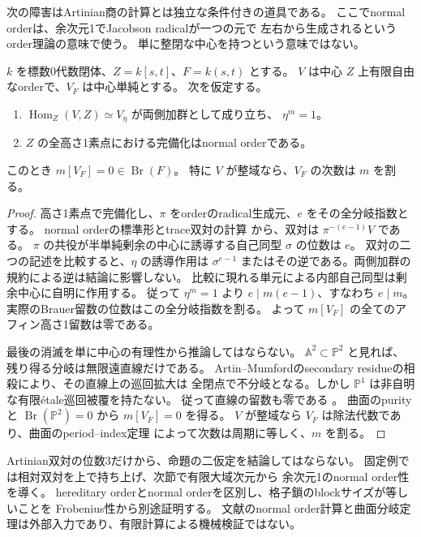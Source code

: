 次の障害はArtinian商の計算とは独立な条件付きの道具である。
ここでnormal orderは、余次元1でJacobson radicalが一つの元で
左右から生成されるというorder理論の意味で使う。
単に整閉な中心を持つという意味ではない。
\begin{proposition}
\label{prop:cubic-Frobenius-order-period}
$k$ を標数0代数閉体、$Z=k[s,t]$、$F=k(s,t)$ とする。
$V$ は中心 $Z$ 上有限自由なorderで、$V_F$ は中心単純とする。
次を仮定する。
\begin{enumerate}
\item $\operatorname{Hom}_Z(V,Z)\simeq V_\eta$ が両側加群として成り立ち、
      $\eta^m=1$。
\item $Z$ の全高さ1素点における完備化はnormal orderである。
\end{enumerate}
このとき $m[V_F]=0\in\operatorname{Br}(F)$。
特に $V$ が整域なら、$V_F$ の次数は $m$ を割る。
\end{proposition}
\begin{proof}
高さ1素点で完備化し、$\pi$ をorderのradical生成元、$e$ をその全分岐指数とする。
normal orderの標準形とtrace双対の計算
\cite[Theorem~10.8, Corollary~10.9, Proposition~10.12]{ChanOrders}
から、双対は $\pi^{-(e-1)}V$ である。
$\pi$ の共役が半単純剰余の中心に誘導する自己同型 $\sigma$ の位数は $e$。
双対の二つの記述を比較すると、$\eta$ の誘導作用は
$\sigma^{e-1}$ またはその逆である。両側加群の規約による逆は結論に影響しない。
比較に現れる単元による内部自己同型は剰余中心に自明に作用する。
従って $\eta^m=1$ より $e\mid m(e-1)$、すなわち $e\mid m$。
実際のBrauer留数の位数はこの全分岐指数を割る。
よって $m[V_F]$ の全てのアフィン高さ1留数は零である。

最後の消滅を単に中心の有理性から推論してはならない。
$\mathbb A^2\subset\mathbb P^2$ と見れば、残り得る分岐は無限遠直線だけである。
Artin--Mumfordのsecondary residueの相殺により、その直線上の巡回拡大は
全閉点で不分岐となる。しかし $\mathbb P^1$ は非自明な有限\'etale巡回被覆を持たない。
従って直線の留数も零である
\cite[Theorem~15.1, Example~15.4(1)]{ChanOrders}。
曲面のpurityと $\operatorname{Br}(\mathbb P^2)=0$
\cite[Theorems~12.5, 15.6]{ChanOrders} から $m[V_F]=0$ を得る。
$V$ が整域なら $V_F$ は除法代数であり、曲面のperiod--index定理
\cite[Theorem~4.2.2.3]{LieblichPeriodIndex} によって次数は周期に等しく、$m$ を割る。
\end{proof}

\begin{remark}[仮定の検証を分離する]
Artinian双対の位数3だけから、命題の二仮定を結論してはならない。
固定例では相対双対を上で持ち上げ、次節で有限大域次元から
余次元1のnormal order性を導く。
hereditary orderとnormal orderを区別し、格子鎖のblockサイズが等しいことを
Frobenius性から別途証明する。
文献のnormal order計算と曲面分岐定理は外部入力であり、有限計算による機械検証ではない。
\end{remark}
